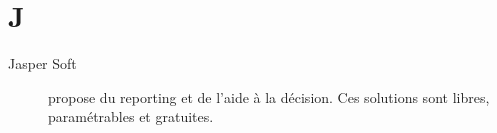 \section{J}

\begin{description}

\item[Jasper Soft] propose du reporting et de l'aide à la décision. Ces solutions
sont libres, paramétrables et gratuites.


\end{description}
